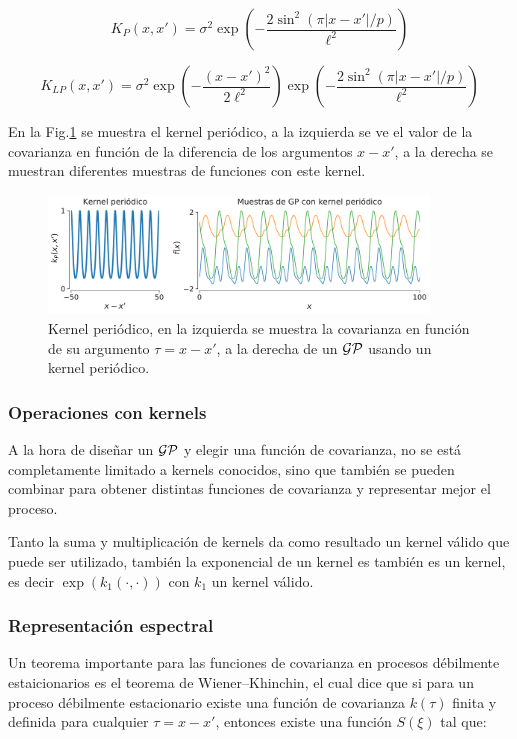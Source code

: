 \begin{equation}\label{eq:gp_kernel_p}
	K_{P}(x, x') = \sigma^2 \exp\left(-\frac{2\sin^2\left(\pi |x- x'| / p \right)}{\ell^2 } \right)
\end{equation}

\begin{equation}\label{eq:gp_kernel_lp}
	K_{LP}(x, x') = \sigma^2  \exp\left(-\frac{\left(x- x' \right)^2}{2\ell^2 } \right) \exp\left(-\frac{2\sin^2\left(\pi |x- x'| / p \right)}{\ell^2 } \right)
\end{equation}

En la Fig.\ref{fig:gp_7} se muestra el kernel periódico, a la izquierda se ve el valor de la covarianza en función de la diferencia de los argumentos $x-x'$, a la derecha se muestran diferentes muestras de funciones con este kernel.

\begin{figure}[H]
	\centering
	\includegraphics[width=0.9\textwidth]{img/cap8_muestras_P.pdf}
	\caption{Kernel periódico, en la izquierda se muestra la covarianza en función de su argumento $\tau=x-x'$, a la derecha de un $\mathcal{GP}$ usando un kernel periódico.}
	\label{fig:gp_7}
\end{figure}

\subsubsection{Operaciones con kernels}
A la hora de diseñar un $\mathcal{GP}$ y elegir una función de covarianza, no se está completamente limitado a kernels conocidos, sino que también se pueden combinar para obtener distintas funciones de covarianza y representar mejor el proceso.

Tanto la suma y multiplicación de kernels da como resultado un kernel válido que puede ser utilizado, también la exponencial de un kernel es también es un kernel, es decir $\exp(k_1(\cdot, \cdot))$ con $k_1$ un kernel válido.

\subsubsection{Representación espectral}
Un teorema importante para las funciones de covarianza en procesos débilmente estaicionarios es el teorema de Wiener–Khinchin, el cual dice que si para un proceso débilmente estacionario existe una función de covarianza $k(\tau)$ finita y definida para cualquier $\tau=x-x'$, entonces existe una función $S(\xi)$ tal que:


